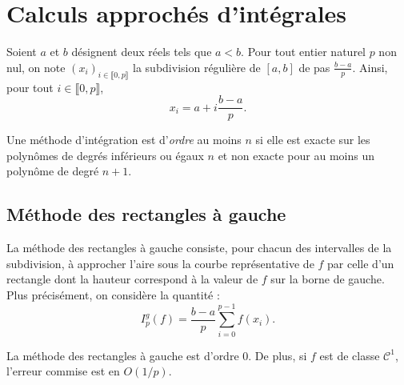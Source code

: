 \section{Calculs approchés d'intégrales}





Soient $a$ et $b$ désignent deux réels tels que $a < b$. Pour tout entier naturel $p$ non nul, on note $(x_i)_{i\in\llbracket 0, p \rrbracket}$ la subdivision régulière de $[a, b]$ de pas $\frac{b-a}{p}$. Ainsi, pour tout $i \in \llbracket 0, p \rrbracket$,
\[
x_i = a + i \frac{b-a}{p}.
\]


\begin{definition}
Une méthode d'intégration est d'\emph{ordre} au moins $n$ si elle est exacte sur les polynômes de degrés inférieurs ou égaux $n$ et non exacte pour au moins un polynôme de degré $n+1$.
\end{definition}

\subsection{Méthode des rectangles à gauche}

La méthode des rectangles à gauche consiste, pour chacun des intervalles de la subdivision, à approcher l'aire sous la courbe représentative de $f$ par celle d'un rectangle dont la hauteur correspond à la valeur de $f$ sur la borne de gauche. Plus précisément, on considère la quantité :
\[
I_p^g(f) = \frac{b-a}{p} \sum_{i=0}^{p-1} f(x_i).
\]

\begin{marginfigure}[0cm]
    \centering
    
\end{marginfigure}

\begin{prop}{}{}
La méthode des rectangles à gauche est d'ordre $0$. De plus, si $f$ est de classe $\mathscr{C}^1$, l'erreur commise est en $O(1/p)$.
\end{prop}

